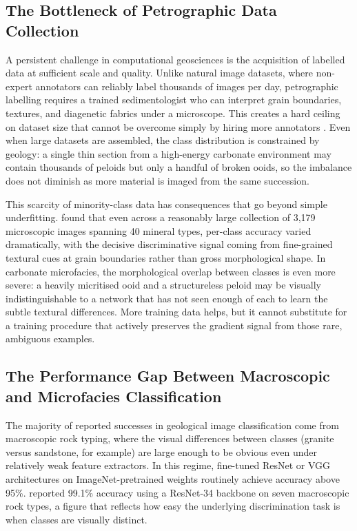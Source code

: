 \documentclass[a4paper,fleqn]{cas-dc}
\begin{document}
\subsection{The Bottleneck of Petrographic Data Collection}
A persistent challenge in computational geosciences is the acquisition of labelled data at sufficient scale and quality. Unlike natural image datasets, where non-expert annotators can reliably label thousands of images per day, petrographic labelling requires a trained sedimentologist who can interpret grain boundaries, textures, and diagenetic fabrics under a microscope. This creates a hard ceiling on dataset size that cannot be overcome simply by hiring more annotators \citep{koeshidayatullah2020}. Even when large datasets are assembled, the class distribution is constrained by geology: a single thin section from a high-energy carbonate environment may contain thousands of peloids but only a handful of broken ooids, so the imbalance does not diminish as more material is imaged from the same succession.

This scarcity of minority-class data has consequences that go beyond simple underfitting. \citet{dalhat2025} found that even across a reasonably large collection of 3,179 microscopic images spanning 40 mineral types, per-class accuracy varied dramatically, with the decisive discriminative signal coming from fine-grained textural cues at grain boundaries rather than gross morphological shape. In carbonate microfacies, the morphological overlap between classes is even more severe: a heavily micritised ooid and a structureless peloid may be visually indistinguishable to a network that has not seen enough of each to learn the subtle textural differences. More training data helps, but it cannot substitute for a training procedure that actively preserves the gradient signal from those rare, ambiguous examples.

\subsection{The Performance Gap Between Macroscopic and Microfacies Classification}
The majority of reported successes in geological image classification come from macroscopic rock typing, where the visual differences between classes (granite versus sandstone, for example) are large enough to be obvious even under relatively weak feature extractors. In this regime, fine-tuned ResNet or VGG architectures on ImageNet-pretrained weights routinely achieve accuracy above 95\%. \citet{chen2023} reported 99.1\% accuracy using a ResNet-34 backbone on seven macroscopic rock types, a figure that reflects how easy the underlying discrimination task is when classes are visually distinct.
\end{document}
